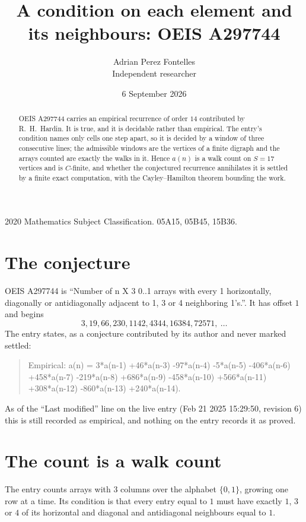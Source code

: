 \documentclass[11pt,a4paper]{article}
\title{A condition on each element and its neighbours: OEIS A297744}
\author{Adrian Perez Fontelles\\ \small Independent researcher}
\date{6 September 2026}
\theoremstyle{plain}
\theoremstyle{definition}
\begin{document}
\maketitle

\begin{abstract}
OEIS A297744 carries an empirical recurrence of order $14$ contributed by R.~H.~Hardin. It is
true, and it is decidable rather than empirical. The entry's condition names only cells one step apart, so it is decided by a window of
three consecutive lines; the
admissible windows are the vertices of a finite digraph and the arrays counted are exactly the
walks in it. Hence $a(n)$ is a walk count on $S=17$ vertices and is $C$-finite, and whether the
conjectured recurrence annihilates it is settled by a finite exact computation, with the
Cayley--Hamilton theorem bounding the work.
\end{abstract}

\noindent\small 2020 Mathematics Subject Classification. 05A15, 05B45, 15B36.\normalsize

\section{The conjecture}

OEIS A297744 is ``Number of n X 3 0..1 arrays with every 1 horizontally, diagonally or antidiagonally adjacent to 1, 3 or 4 neighboring 1's.''. It has offset $1$ and begins
\[
3, 19, 66, 230, 1142, 4344, 16384, 72571,\ \dots
\]
The entry states, as a conjecture contributed by its author and never marked settled:
\begin{quote}
Empirical: a(n) = 3*a(n-1) +46*a(n-3) -97*a(n-4) -5*a(n-5) -406*a(n-6) +458*a(n-7) -219*a(n-8) +686*a(n-9) -458*a(n-10) +566*a(n-11) +308*a(n-12) -860*a(n-13) +240*a(n-14).
\end{quote}
As of the ``Last modified'' line on the live entry (Feb 21 2025 15:29:50, revision 6) this is still
recorded as empirical, and nothing on the entry records it as proved.

\section{The count is a walk count}

The entry counts arrays with $3$ columns over the alphabet $\{0,1\}$, growing one row at a time. Its condition is that every entry equal to $1$ must have exactly $1$, $3$ or $4$ of its horizontal and diagonal and antidiagonal neighbours equal to $1$.
\end{document}
